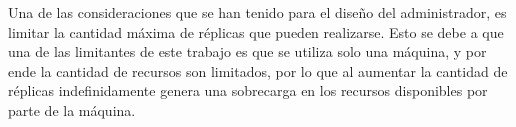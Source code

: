Una de las consideraciones que se han tenido para el diseño del administrador, es limitar la cantidad máxima de réplicas que pueden realizarse. Esto se debe a que una de las limitantes de este trabajo es que se utiliza solo una máquina, y por ende la cantidad de recursos son limitados, por lo que al aumentar la cantidad de réplicas indefinidamente genera una sobrecarga en los recursos disponibles por parte de la máquina.